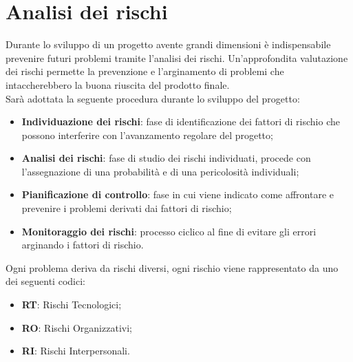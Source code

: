 \section{Analisi dei rischi}

Durante lo sviluppo di un progetto avente grandi dimensioni è indispensabile prevenire 
futuri problemi tramite l'analisi dei rischi. Un'approfondita valutazione dei rischi permette la prevenzione e l'arginamento di problemi che intaccherebbero la buona riuscita del prodotto finale.\\
Sarà adottata la seguente procedura durante lo sviluppo del progetto:

\begin{itemize}
	\item \textbf{Individuazione dei rischi}: fase di identificazione dei fattori di rischio che possono interferire con l'avanzamento regolare del progetto;
	\item \textbf{Analisi dei rischi}: fase di studio dei rischi individuati, procede con l'assegnazione di una probabilità e di una pericolosità individuali;
	\item \textbf{Pianificazione di controllo}: fase in cui viene indicato come affrontare e prevenire
	i problemi derivati dai fattori di rischio;
	\item \textbf{Monitoraggio dei rischi}: processo ciclico al fine di evitare gli errori arginando i 
	fattori di rischio.
\end{itemize}
Ogni problema deriva da rischi diversi, ogni rischio viene rappresentato da uno dei seguenti codici:

\begin{itemize}
	\item \textbf{RT}: Rischi Tecnologici;
	\item \textbf{RO}: Rischi Organizzativi;
	\item \textbf{RI}: Rischi Interpersonali.
\end{itemize}

